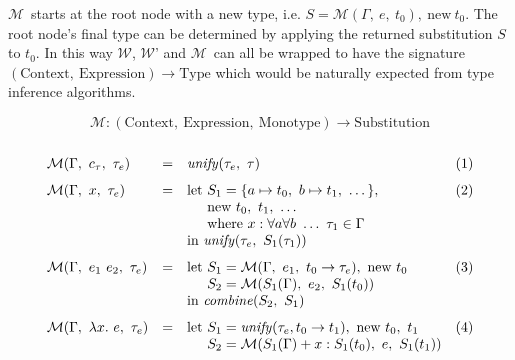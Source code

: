 \documentclass[a4paper,fleqn,oneside,12pt]{report}
\newcommand{\W}{$\mathcal{W}$}
\newcommand{\M}{$\mathcal{M}$}
\begin{document}
\M\ starts at the root node with a new type, i.e. $S = \mathcal{M}(\Gamma,\ e,\ t_0),\ \mathrm{new}\ t_0$. The root node's final type can be determined by applying the returned substitution $S$ to $t_0$. In this way \W, \W' and \M\ can all be wrapped to have the signature $(\mathrm{Context},\ \mathrm{Expression}) \rightarrow \mathrm{Type}$ which would be naturally expected from type inference algorithms.

$$
\mathcal{M} : (\mathrm{Context},\ \mathrm{Expression},\ \mathrm{Monotype}) \rightarrow \mathrm{Substitution}
$$$$
\begin{array}{lclc}
  \\
    \mathcal{M}(\Gamma,\ c_{\tau},\ \tau_e)                                & = & \mathit{unify}(\tau_e,\ \tau) & (1)\vspace{0.25cm}\\
    \mathcal{M}(\Gamma,\ x,\ \tau_e)                                       & = & \textrm{let}\ S_1 = \{ a \mapsto t_0,\ b \mapsto t_1,\ \dots \},& (2)\\
                                                                           &   & \phantom{\textrm{let}}\ \textrm{new}\ t_0,\ t_1,\ \dots &\\
                                                                           &   & \phantom{\textrm{let}}\ \textrm{where}\ x : \forall a \forall b\ \dots\ \tau_1 \in \Gamma &\\
                                                                           &   & \textrm{in}\ \mathit{unify}(\tau_e,\ S_1(\tau_1)) &\vspace{0.25cm}\\
    \mathcal{M}(\Gamma,\ e_1\ e_2,\ \tau_e)                                & = & \textrm{let}\ S_1 = \mathcal{M}(\Gamma,\ e_1,\ t_0 \rightarrow \tau_e),\ \textrm{new}\ t_0 & (3)\\
                                                                           &   & \phantom{\textrm{let}}\ S_2 = \mathcal{M}(S_1(\Gamma),\ e_2,\ S_1(t_0)) &\\
                                                                           &   & \textrm{in}\ \mathit{combine}(S_2,\ S_1) &\vspace{0.25cm}\\
    \mathcal{M}(\Gamma,\ \lambda x.\ e,\ \tau_e)                           & = & \textrm{let}\ S_1 = \mathit{unify}(\tau_e, t_0 \rightarrow t_1),\ \textrm{new}\ t_0,\ t_1 & (4)\\
                                                                           &   & \phantom{\textrm{let}}\ S_2 = \mathcal{M}(S_1(\Gamma) + x : S_1(t_0),\ e,\ S_1(t_1)) &\\

\end{array}$$
\end{document}
